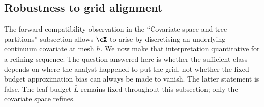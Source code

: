 
\newcommand{\ezn}{e_{0,n}}
\newcommand{\mzn}{\mu_{0,n}}

\subsection{Robustness to grid alignment}
\label{sec:grid-alignment}

The forward-compatibility observation in the ``Covariate space and tree
partitions'' subsection allows $\cX$ to arise by discretising an underlying
continuum covariate at mesh $h$.  We now make that interpretation quantitative
for a refining sequence.  The question answered here is whether the sufficient
class depends on where the analyst happened to put the grid, not whether the
fixed-budget approximation bias can always be made to vanish.  The latter
statement is false.  The leaf budget $\bar L$ remains fixed throughout this
subsection; only the covariate space refines.

